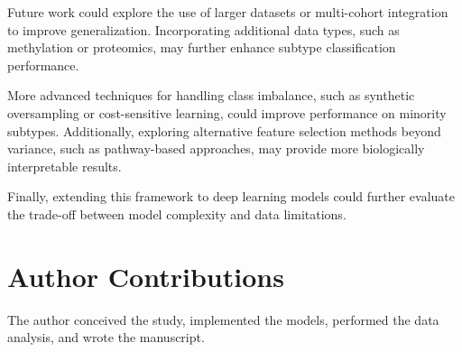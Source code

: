 \documentclass[10pt,twocolumn,letterpaper]{article}
\begin{document}
Future work could explore the use of larger datasets or multi-cohort integration to improve generalization. Incorporating additional data types, such as methylation or proteomics, may further enhance subtype classification performance.

More advanced techniques for handling class imbalance, such as synthetic oversampling or cost-sensitive learning, could improve performance on minority subtypes. Additionally, exploring alternative feature selection methods beyond variance, such as pathway-based approaches, may provide more biologically interpretable results.

Finally, extending this framework to deep learning models could further evaluate the trade-off between model complexity and data limitations.

\section*{Author Contributions}

The author conceived the study, implemented the models, performed the data analysis, and wrote the manuscript.

{\small


}
\end{document}
